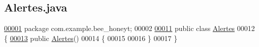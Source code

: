 \hypertarget{_alertes_8java_source}{}\subsection{Alertes.\+java}
\label{_alertes_8java_source}

\begin{DoxyCode}
\hyperlink{namespacecom_1_1example_1_1bee__honeyt}{00001} \textcolor{keyword}{package }com.example.bee\_honeyt;
00002 
\hyperlink{classcom_1_1example_1_1bee__honeyt_1_1_alertes}{00011} \textcolor{keyword}{public} \textcolor{keyword}{class }\hyperlink{classcom_1_1example_1_1bee__honeyt_1_1_alertes}{Alertes}
00012 \{
\hyperlink{classcom_1_1example_1_1bee__honeyt_1_1_alertes_a8a4cde771fa2eeea4df67f2b82b3958a}{00013}     \textcolor{keyword}{public} \hyperlink{classcom_1_1example_1_1bee__honeyt_1_1_alertes_a8a4cde771fa2eeea4df67f2b82b3958a}{Alertes}()
00014     \{
00015 
00016     \}
00017 \}
\end{DoxyCode}
